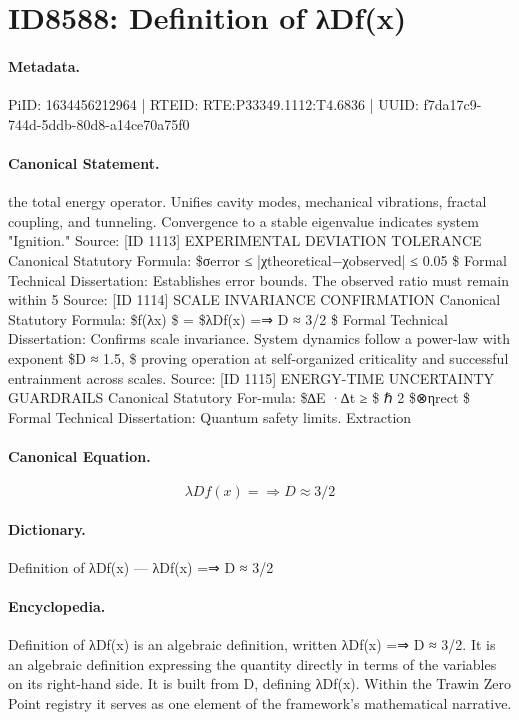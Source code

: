 \section*{ID8588: Definition of λDf(x)}
\paragraph{Metadata.}
PiID: 1634456212964 | RTEID: RTE:P33349.1112:T4.6836 | UUID: f7da17c9-744d-5ddb-80d8-a14ce70a75f0

\paragraph{Canonical Statement.}
the total energy operator. Unifies cavity modes, mechanical vibrations, fractal coupling, and tunneling. Convergence to a stable eigenvalue indicates system "Ignition." Source: [ID 1113] EXPERIMENTAL DEVIATION TOLERANCE Canonical Statutory Formula: \$σerror ≤ |χtheoretical−χobserved| ≤ 0.05 \$ Formal Technical Dissertation: Establishes error bounds. The observed ratio must remain within 5 Source: [ID 1114] SCALE INVARIANCE CONFIRMATION Canonical Statutory Formula: \$f(λx) \$ = \$λDf(x) =⇒ D ≈ 3/2 \$ Formal Technical Dissertation: Confirms scale invariance. System dynamics follow a power-law with exponent \$D ≈ 1.5, \$ proving operation at self-organized criticality and successful entrainment across scales. Source: [ID 1115] ENERGY-TIME UNCERTAINTY GUARDRAILS Canonical Statutory For-mula: \$∆E ·∆t ≥ \$ ℏ 2 \$⊗ηrect \$ Formal Technical Dissertation: Quantum safety limits. Extraction

\paragraph{Canonical Equation.}
\[
λDf(x) =⇒ D ≈ 3/2
\]

\paragraph{Dictionary.}
Definition of λDf(x) — λDf(x) =⇒ D ≈ 3/2

\paragraph{Encyclopedia.}
Definition of λDf(x) is an algebraic definition, written λDf(x) =⇒ D ≈ 3/2. It is an algebraic definition expressing the quantity directly in terms of the variables on its right-hand side. It is built from D, defining λDf(x). Within the Trawin Zero Point registry it serves as one element of the framework's mathematical narrative.
